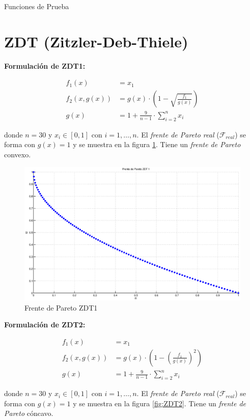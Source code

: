 \begin{chapter}{Funciones de Prueba}

\section*{ZDT (Zitzler-Deb-Thiele)} 

\textbf{Formulaci\'on de ZDT1:}

\begin{align*}
f_1(x)&=x_1\\
f_2(x,g(x))&=g(x)\cdot\left(1-\sqrt{ \frac{f_1}{g(x)}}\right)\\
g(x)&=1+\frac{9}{n-1}\cdot\sum_{i=2}^nx_i
\end{align*}

donde $n=30$ y $x_i\in[0,1]$ con $i=1,\ldots, n$. El \textit{frente de Pareto real} ($\mathcal{F}_{real}$) se forma con $g(x)=1$ y se muestra
en la figura \ref{fig:ZDT1}. Tiene un \textit{frente de Pareto} convexo.

\begin{figure}[h!]
 \centering
    \includegraphics[scale=0.43]{ApendiceA/paretoZDT1.eps}
\caption{Frente de Pareto ZDT1}
\label{fig:ZDT1}
\end{figure} 

\textbf{Formulaci\'on de ZDT2:}

\begin{align*}
f_1(x)&=x_1\\
f_2(x,g(x))&=g(x)\cdot(1- \left( \frac{f_1}{g(x)}\right)^2)\\
g(x)&=1+\frac{9}{n-1}\cdot\sum_{i=2}^nx_i
\end{align*}

donde $n=30$ y $x_i\in[0,1]$ con $i=1,\ldots, n$. El \textit{frente de Pareto real} ($\mathcal{F}_{real}$) se forma con $g(x)=1$ y se muestra 
en la figura \ref{fig:ZDT2}. Tiene un \textit{frente de Pareto} c\'oncavo.


\end{chapter}
